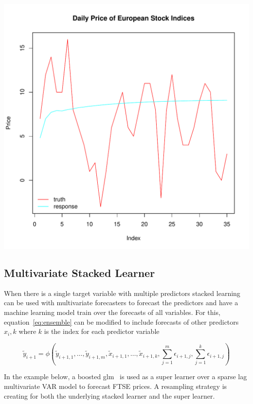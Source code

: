 \documentclass[12pt]{article}\usepackage[]{graphicx}\usepackage[]{color}
\makeatletter
\def\maxwidth{ %
  \ifdim\Gin@nat@width>\linewidth
    \linewidth
  \else
    \Gin@nat@width
  \fi
}
\newenvironment{knitrout}{}{} %
\theoremstyle{definition}
\makeatother
\begin{document}
\begin{knitrout}
\color{fgcolor}
\includegraphics[width=\maxwidth]{figure/ensembleForecast5-1} 

\end{knitrout}
\doublespacing

\subsection{Multivariate Stacked Learner}
\label{sub:multiStack}

When there is a single target variable with multiple predictors stacked learning can be used with multivariate forecasters to forecast the predictors and have a machine learning model train over the forecasts of all variables. For this, equation~\ref{eq:ensemble} can be modified to include forecasts of other predictors $x_i,k$ where $k$ is the index for each predictor variable

\begin{equation}
\tilde{y}_{i+1} = \phi(\tilde{y}_{i+1,1},\dots, \tilde{y}_{i+1,m}, \tilde{x}_{i+1,1},\dots, \tilde{x}_{i+1,k}, \sum_{j=1}^m \epsilon_{i+1,j}, \sum_{j=1}^k \epsilon_{i+1,j})
\label{eq:ensembleMulti}
\end{equation}

In the example below, a boosted glm~\cite{glmboost} is used as a super learner over a sparse lag multivariate VAR model to forecast FTSE prices. A resampling strategy is creating for both the underlying stacked learner and the super learner.
\end{document}
